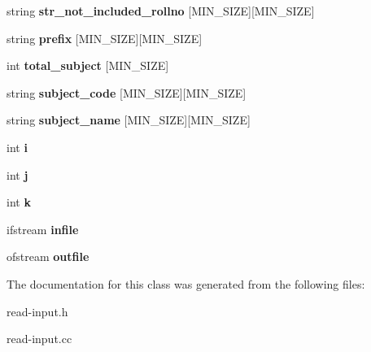 \begin{DoxyCompactItemize}
\item 
\hypertarget{classReadInput_af8bf5dd02c9ad4baa9b3dad46de05584}{string {\bfseries str\-\_\-not\-\_\-included\-\_\-rollno} \mbox{[}M\-I\-N\-\_\-\-S\-I\-Z\-E\mbox{]}\mbox{[}M\-I\-N\-\_\-\-S\-I\-Z\-E\mbox{]}}\label{classReadInput_af8bf5dd02c9ad4baa9b3dad46de05584}

\item 
\hypertarget{classReadInput_a22e77d892c3c600f6d1344c54d0953dd}{string {\bfseries prefix} \mbox{[}M\-I\-N\-\_\-\-S\-I\-Z\-E\mbox{]}\mbox{[}M\-I\-N\-\_\-\-S\-I\-Z\-E\mbox{]}}\label{classReadInput_a22e77d892c3c600f6d1344c54d0953dd}

\item 
\hypertarget{classReadInput_a6104862202913ac59bae308e9f61fbd5}{int {\bfseries total\-\_\-subject} \mbox{[}M\-I\-N\-\_\-\-S\-I\-Z\-E\mbox{]}}\label{classReadInput_a6104862202913ac59bae308e9f61fbd5}

\item 
\hypertarget{classReadInput_ad54949b5b77968f69e6459e24aa29cd8}{string {\bfseries subject\-\_\-code} \mbox{[}M\-I\-N\-\_\-\-S\-I\-Z\-E\mbox{]}\mbox{[}M\-I\-N\-\_\-\-S\-I\-Z\-E\mbox{]}}\label{classReadInput_ad54949b5b77968f69e6459e24aa29cd8}

\item 
\hypertarget{classReadInput_aed16990a1fd7dfc21c69fbf07892c256}{string {\bfseries subject\-\_\-name} \mbox{[}M\-I\-N\-\_\-\-S\-I\-Z\-E\mbox{]}\mbox{[}M\-I\-N\-\_\-\-S\-I\-Z\-E\mbox{]}}\label{classReadInput_aed16990a1fd7dfc21c69fbf07892c256}

\item 
\hypertarget{classReadInput_aa5794ec3922f26d376dba09946e73178}{int {\bfseries i}}\label{classReadInput_aa5794ec3922f26d376dba09946e73178}

\item 
\hypertarget{classReadInput_a9cff282fd247d9eca49c1acde4d08b11}{int {\bfseries j}}\label{classReadInput_a9cff282fd247d9eca49c1acde4d08b11}

\item 
\hypertarget{classReadInput_a28d5df9f425e54bb3575bdcc4d41a4d1}{int {\bfseries k}}\label{classReadInput_a28d5df9f425e54bb3575bdcc4d41a4d1}

\item 
\hypertarget{classReadInput_a0d12e64fa5ff8c210f5ac494021318ae}{ifstream {\bfseries infile}}\label{classReadInput_a0d12e64fa5ff8c210f5ac494021318ae}

\item 
\hypertarget{classReadInput_aa25ad1c8e7ef638eddc2ffb96e1c49c2}{ofstream {\bfseries outfile}}\label{classReadInput_aa25ad1c8e7ef638eddc2ffb96e1c49c2}

\end{DoxyCompactItemize}


The documentation for this class was generated from the following files\-:\begin{DoxyCompactItemize}
\item 
read-\/input.\-h\item 
read-\/input.\-cc\end{DoxyCompactItemize}
